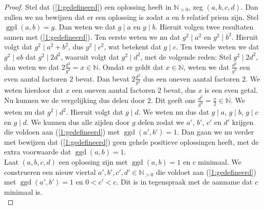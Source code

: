 \documentclass[12pt,reqno]{article}
\newcommand*{\NN}{\ensuremath{\mathbb{N}}}
\newcommand*{\NO}{\ensuremath{\mathbb{N}_{>0}}}
\theoremstyle{theorem}
\theoremstyle{definition}
\DeclareMathOperator{\ggd}{ggd}
\begin{document}
\begin{proof}
		Stel dat (\ref{1:gedefineerd}) een oplossing heeft in $\NO$, zeg $(a, b, c, d)$. Dan zullen we nu bewijzen dat er een oplossing is zodat $a$ en $b$ relatief priem zijn. Stel $\ggd(a,b) = g$. Dan weten we dat $g \mid a$ en $g \mid b$. Hieruit volgen twee resultaten samen met (\ref{1:gedefineerd}). Ten eerste weten we nu dat $g^2 \mid a^2$ en $g^2 \mid b^2$. Hieruit volgt dat $g^2 \mid a^2 + b^2$, dus $g^2 \mid c^2$, wat betekent dat $g \mid c$. Ten tweede weten we dat $g^2 \mid ab$ dat $g^2 \mid 2d^2$, waaruit volgt dat $g^2 \mid d^2$, met de volgende reden: Stel $g^2 \mid 2d^2$, dan weten we dat $2\frac{d^2}{g^2} = x \in\NN$. Omdat er geldt dat $x\in\NN$, weten we dat $\frac{d^2}{g^2}$ een even aantal factoren $2$ bevat. Dan bevat $2\frac{d^2}{g^2}$ dus een oneven aantal factoren $2$. We weten hierdoor dat $x$ een oneven aantal factoren $2$ bevat, dus $x$ is een even getal. Nu kunnen we de vergelijking dus delen door $2$. Dit geeft ons $\frac{d^2}{g^2}=\frac{x}{2} \in\NN$. We weten nu dat $g^2 \mid d^2$. Hieruit volgt dat $g \mid d$. We weten nu dus dat $g \mid a$, $g \mid b$, $g \mid c$ en $g \mid d$. We kunnen dus alle zijden door $g$ delen zodat we $a'$, $b'$, $c'$ en $d'$ krijgen die voldoen aan (\ref{1:gedefineerd}) met $\ggd(a',b') = 1$. Dan gaan we nu verder met bewijzen dat (\ref{1:gedefineerd}) geen gehele positieve oplossingen heeft, met de extra voorwaarde dat $\ggd(a,b) = 1$.\\
		
		Laat $(a, b, c, d)$ een oplossing zijn met $\ggd(a,b) = 1$ en $c$ minimaal. We construeren een nieuw viertal $a', b', c', d' \in\NO$ die voldoet aan (\ref{1:gedefineerd}) met $\ggd(a',b') = 1$ en $0 < c' < c$. Dit is in tegenspraak met de aanname dat $c$ minimaal is.\\
		

\end{proof}
\end{document}
